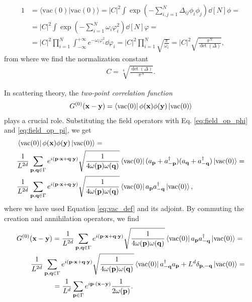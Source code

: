 \documentclass[a4paper,10pt]{report}
\begin{document}
\begin{align}
1 &= \langle\mathrm{vac}(0)|\mathrm{vac}(0)\rangle = |C|^2\int\exp(-\sum_{i,j=1}^N\Delta_{ij}\phi_i\phi_j)\dd[N]{\phi} = \nonumber\\
&=|C|^2\int\exp(-\sum_{i=1}^N\omega_i\varphi_i^2)\dd[N]{\varphi} = \nonumber\\
&=|C|^2\prod_{i=1}^N\int_{-\infty}^{+\infty}e^{-\omega_i\varphi_i^2}\dd\varphi_i = |C|^2\prod_{i=1}^N\sqrt{\frac{\pi}{\omega_i}} = |C|^2\sqrt{\frac{\pi^N}{\det(\Delta)}},
\end{align}
from where we find the normalization constant
\begin{align}
C = \sqrt[4]{\frac{\det(\Delta)}{\pi^N}}.
\end{align}

In scattering theory, the \textit{two-point correlation function}
\begin{align}
G^{(0)}(\mathbf{x}-\mathbf{y}) = \bra{\mathrm{vac}(0)}\phi(\mathbf{x})\phi(\mathbf{y})\ket{\mathrm{vac}(0)} 
\end{align}
plays a crucial role. Substituting the field operators with Eq. \eqref{eq:field_op_phi} and \eqref{eq:field_op_pi}, we get
\begin{align}
&\bra{\mathrm{vac}(0)}\phi(\mathbf{x})\phi(\mathbf{y})\ket{\mathrm{vac}(0)} = \nonumber\\
&\frac{1}{L^{2d}}\sum_{\mathbf{p},\mathbf{q}\in\Gamma}e^{i(\mathbf{p}\cdot\mathbf{x}+\mathbf{q}\cdot\mathbf{y})}\sqrt{\frac{1}{4\omega(\mathbf{p})\omega(\mathbf{q})}}\bra{\mathrm{vac}(0)}(a_\mathbf{p} + a^\dag_{-\mathbf{p}})(a_\mathbf{q} + a^\dag_{-\mathbf{q}})\ket{\mathrm{vac}(0)} = \nonumber\\
&\frac{1}{L^{2d}}\sum_{\mathbf{p},\mathbf{q}\in\Gamma}e^{i(\mathbf{p}\cdot\mathbf{x}+\mathbf{q}\cdot\mathbf{y})}\sqrt{\frac{1}{4\omega(\mathbf{p})\omega(\mathbf{q})}}\bra{\mathrm{vac}(0)}a_\mathbf{p}a^\dag_{-\mathbf{q}}\ket{\mathrm{vac}(0)},
\end{align}
where we have used Equation \eqref{eq:vac_def} and its adjoint. By commuting the creation and annihilation operators, we find
\begin{align}
&G^{(0)}(\mathbf{x}-\mathbf{y}) = \frac{1}{L^{2d}}\sum_{\mathbf{p},\mathbf{q}\in\Gamma}e^{i(\mathbf{p}\cdot\mathbf{x}+\mathbf{q}\cdot\mathbf{y})}\sqrt{\frac{1}{4\omega(\mathbf{p})\omega(\mathbf{q})}}\bra{\mathrm{vac}(0)}a_\mathbf{p}a^\dag_{-\mathbf{q}}\ket{\mathrm{vac}(0)} = \nonumber\\
&\qquad\frac{1}{L^{2d}}\sum_{\mathbf{p},\mathbf{q}\in\Gamma}e^{i(\mathbf{p}\cdot\mathbf{x}+\mathbf{q}\cdot\mathbf{y})}\sqrt{\frac{1}{4\omega(\mathbf{p})\omega(\mathbf{q})}}\bra{\mathrm{vac}(0)}a^\dag_{-\mathbf{q}}a_\mathbf{p} + L^d\delta_{\mathbf{p},-\mathbf{q}}\ket{\mathrm{vac}(0)} = \nonumber\\
&\hspace{1.8cm}= \frac{1}{L^{d}}\sum_{\mathbf{p}\in\Gamma}e^{i\mathbf{p}\cdot(\mathbf{x}-\mathbf{y})}\frac{1}{2\omega(\mathbf{p})}.
\end{align}
\end{document}
